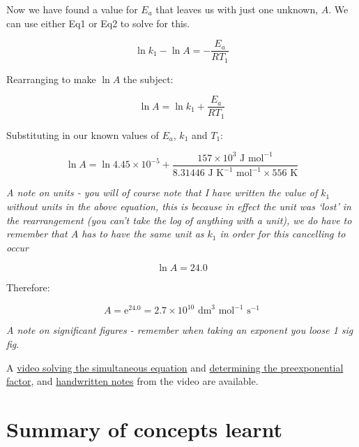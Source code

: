 \documentclass[
]{book}
\begin{document}
Now we have found a value for \(E_a\) that leaves us with just one unknown, \(A\). We can use either Eq1 or Eq2 to solve for this.

\begin{equation*}
\ln {k_1} - \ln {A}= -\frac{E_a}{RT_1} 
\end{equation*}

Rearranging to make \(\ln A\) the subject:

\begin{equation*}
\ln {A}= \ln {k_1} + \frac{E_a}{RT_1} 
\end{equation*}

Substituting in our known values of \(E_a\), \(k_1\) and \(T_1\):

\begin{equation*}
\ln {A}= \ln {4.45 \times 10^{-5}} + \frac{157 \times 10^3\textrm{ J mol}^{-1}}{8.31446 \textrm{ J K}^{-1} \textrm{ mol}^{-1} \times 556 \textrm{ K}} 
\end{equation*}

\emph{A note on units - you will of course note that I have written the value of \(k_1\) without units in the above equation, this is because in effect the unit was `lost' in the rearrangement (you can't take the log of anything with a unit), we do have to remember that \(A\) has to have the same unit as \(k_1\) in order for this cancelling to occur}

\begin{equation*}
\ln {A}= 24.0
\end{equation*}

Therefore:

\begin{equation*}
A= \textrm{e}^{24.0} = 2.7 \times 10^{10} \textrm{ dm}^3 \textrm{ mol}^{-1} \textrm{ s}^{-1}
\end{equation*}

\emph{A note on significant figures - remember when taking an exponent you loose 1 sig fig}.

A \href{https://youtu.be/hrwBXtnWVAA}{video solving the simultaneous equation} and \href{https://youtu.be/608WX_mLfBI}{determining the preexponential factor}, and \href{http://workitoutwithapencil.xyz/wp-content/uploads/2021/07/Solving-problems-using-simultaneous-equations-2.pdf}{handwritten notes} from the video are available.

\hypertarget{sec:summary2}{%
\section{Summary of concepts learnt}\label{sec:summary2}}
\end{document}
